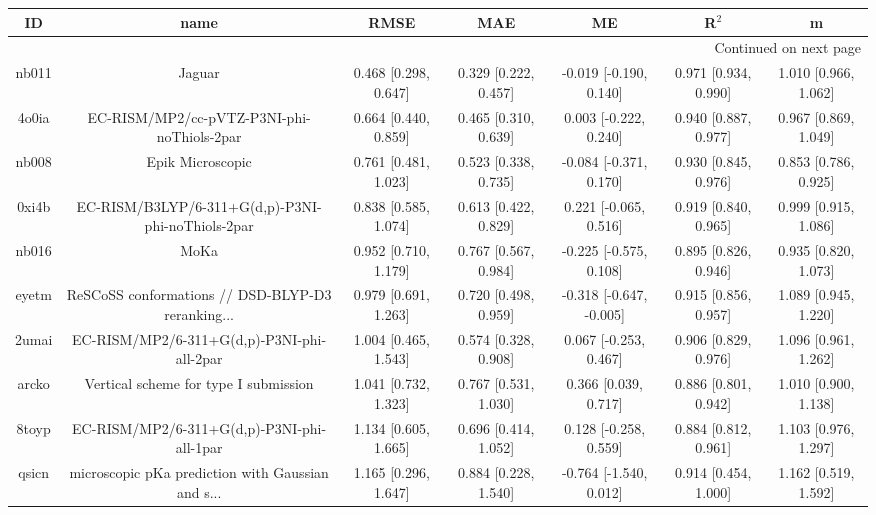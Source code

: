 \documentclass{article}
\begin{document}
\begin{center}
\begin{longtable}{|ccccccc|}
\toprule
    ID &                                               name &                  RMSE &                   MAE &                       ME &                 R$^2$ &                     m \\
\midrule
\endhead
\midrule
\multicolumn{7}{r}{{Continued on next page}} \\
\midrule
\endfoot

\bottomrule
\endlastfoot
 nb011 &                                             Jaguar &  0.468 [0.298, 0.647] &  0.329 [0.222, 0.457] &   -0.019 [-0.190, 0.140] &  0.971 [0.934, 0.990] &  1.010 [0.966, 1.062] \\
 4o0ia &         EC-RISM/MP2/cc-pVTZ-P3NI-phi-noThiols-2par &  0.664 [0.440, 0.859] &  0.465 [0.310, 0.639] &    0.003 [-0.222, 0.240] &  0.940 [0.887, 0.977] &  0.967 [0.869, 1.049] \\
 nb008 &                                   Epik Microscopic &  0.761 [0.481, 1.023] &  0.523 [0.338, 0.735] &   -0.084 [-0.371, 0.170] &  0.930 [0.845, 0.976] &  0.853 [0.786, 0.925] \\
 0xi4b &  EC-RISM/B3LYP/6-311+G(d,p)-P3NI-phi-noThiols-2par &  0.838 [0.585, 1.074] &  0.613 [0.422, 0.829] &    0.221 [-0.065, 0.516] &  0.919 [0.840, 0.965] &  0.999 [0.915, 1.086] \\
 nb016 &                                               MoKa &  0.952 [0.710, 1.179] &  0.767 [0.567, 0.984] &   -0.225 [-0.575, 0.108] &  0.895 [0.826, 0.946] &  0.935 [0.820, 1.073] \\
 eyetm &  ReSCoSS conformations // DSD-BLYP-D3 reranking... &  0.979 [0.691, 1.263] &  0.720 [0.498, 0.959] &  -0.318 [-0.647, -0.005] &  0.915 [0.856, 0.957] &  1.089 [0.945, 1.220] \\
 2umai &         EC-RISM/MP2/6-311+G(d,p)-P3NI-phi-all-2par &  1.004 [0.465, 1.543] &  0.574 [0.328, 0.908] &    0.067 [-0.253, 0.467] &  0.906 [0.829, 0.976] &  1.096 [0.961, 1.262] \\
 arcko &              Vertical scheme for type I submission &  1.041 [0.732, 1.323] &  0.767 [0.531, 1.030] &     0.366 [0.039, 0.717] &  0.886 [0.801, 0.942] &  1.010 [0.900, 1.138] \\
 8toyp &         EC-RISM/MP2/6-311+G(d,p)-P3NI-phi-all-1par &  1.134 [0.605, 1.665] &  0.696 [0.414, 1.052] &    0.128 [-0.258, 0.559] &  0.884 [0.812, 0.961] &  1.103 [0.976, 1.297] \\
 qsicn &  microscopic pKa prediction with Gaussian and s... &  1.165 [0.296, 1.647] &  0.884 [0.228, 1.540] &   -0.764 [-1.540, 0.012] &  0.914 [0.454, 1.000] &  1.162 [0.519, 1.592] \\

\end{longtable}
\end{center}
\end{document}
